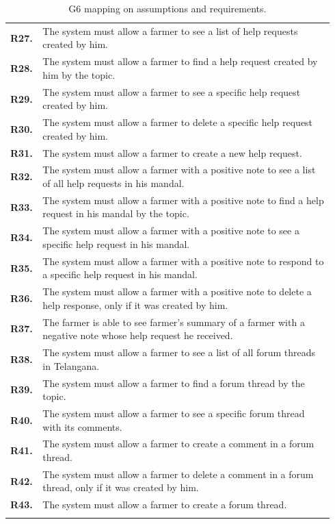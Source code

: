 \begin{longtable}{p{0.06\linewidth} p{0.88\linewidth}}
	\textbf{R27.} & The system must allow a farmer to see a list of help requests created by him.\\
	\textbf{R28.} & The system must allow a farmer to find a help request created by him by the topic.\\
	\textbf{R29.} & The system must allow a farmer to see a specific help request created by him.\\
	\textbf{R30.} & The system must allow a farmer to delete a specific help request created by him.\\
	\textbf{R31.} & The system must allow a farmer to create a new help request.\\
	\textbf{R32.} & The system must allow a farmer with a positive note to see a list of all help requests in his mandal.\\
	\textbf{R33.} & The system must allow a farmer with a positive note to find a help request in his mandal by the topic.\\
	\textbf{R34.} & The system must allow a farmer with a positive note to see a specific help request in his mandal.\\
	\textbf{R35.} & The system must allow a farmer with a positive note to respond to a specific help request in his mandal.\\
	\textbf{R36.} & The system must allow a farmer with a positive note to delete a help response, only if it was created by him.\\
	\textbf{R37.} & The farmer is able to see farmer's summary of a farmer with a negative note whose help request he received. \\
	\textbf{R38.} & The system must allow a farmer to see a list of all forum threads in Telangana.\\
	\textbf{R39.} & The system must allow a farmer to find a forum thread by the topic.\\
	\textbf{R40.} & The system must allow a farmer to see a specific forum thread with its comments.\\
	\textbf{R41.} & The system must allow a farmer to create a comment in a forum thread.\\
	\textbf{R42.} & The system must allow a farmer to delete a comment in a forum thread, only if it was created by him.\\
	\textbf{R43.} & The system must allow a farmer to create a forum thread.\\
	
    \bottomrule
    \caption{G6 mapping on assumptions and requirements.}
\end{longtable}

